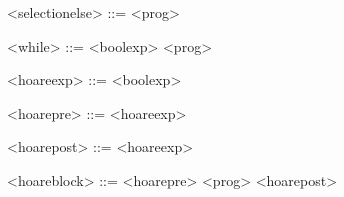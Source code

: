 \begin{grammarEx}
	<selection\textunderscore else> ::=  <prog> 
	\alt \straightepsilon{} 
	
	<while> ::=  <bool\textunderscore exp>  <prog>  
	
	<hoare\textunderscore exp> ::= \lit{\{} <bool\textunderscore exp> \lit{\}} 
	
	<hoare\textunderscore pre> ::=  <hoare\textunderscore exp> 
	
	<hoare\textunderscore post> ::=  <hoare\textunderscore exp> 
	
	<hoare\textunderscore block> ::= <hoare\textunderscore pre> <prog> <hoare\textunderscore post> 
\end{grammarEx}